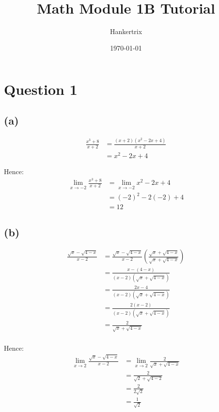 \documentclass[11pt]{article}
\author{Hankertrix}
\date{\today}
\title{Math Module 1B Tutorial}
\begin{document}
\maketitle
\setcounter{tocdepth}{2}
\tableofcontents

\newpage

\section{Question 1}
\label{sec:org2349999}

\subsection{(a)}
\label{sec:orgf900a1f}

\begin{align*}
\frac{x^3 + 8}{x + 2} &= \frac{(x + 2)(x^2 - 2x + 4)}{x + 2} \\
&= x^2 - 2x + 4
\end{align*}

Hence:
\begin{align*}
\lim_{x \rightarrow -2} \frac{x^3 + 8}{x + 2} &= \lim_{x \rightarrow -2} x^2 - 2x + 4 \\
&= (-2)^2 - 2(-2) + 4 \\
&= 12
\end{align*}

\subsection{(b)}
\label{sec:orge572c3d}

\begin{align*}
\frac{\sqrt{x} - \sqrt{4 - x}}{x - 2} &= \frac{\sqrt{x} - \sqrt{4 - x}}{x - 2} \left(\frac{\sqrt{x} + \sqrt{4 - x}}{\sqrt{x} + \sqrt{4 - x}}\right) \\
&= \frac{x - (4 - x)}{(x - 2)(\sqrt{x} + \sqrt{4 - x})} \\
&= \frac{2x - 4}{(x - 2)(\sqrt{x} + \sqrt{4 - x})} \\
&= \frac{2(x - 2)}{(x - 2)(\sqrt{x} + \sqrt{4 - x})} \\
&= \frac{2}{\sqrt{x} + \sqrt{4 - x}} \\
\end{align*}

Hence:
\begin{align*}
\lim_{x \rightarrow 2} \frac{\sqrt{x} - \sqrt{4 - x}}{x - 2} &= \lim_{x \rightarrow 2} \frac{2}{\sqrt{x} + \sqrt{4 - x}} \\
&= \frac{2}{\sqrt{2} + \sqrt{4 - 2}} \\
&= \frac{2}{2 \sqrt{2}} \\
&= \frac{1}{\sqrt{2}}
\end{align*}
\end{document}
